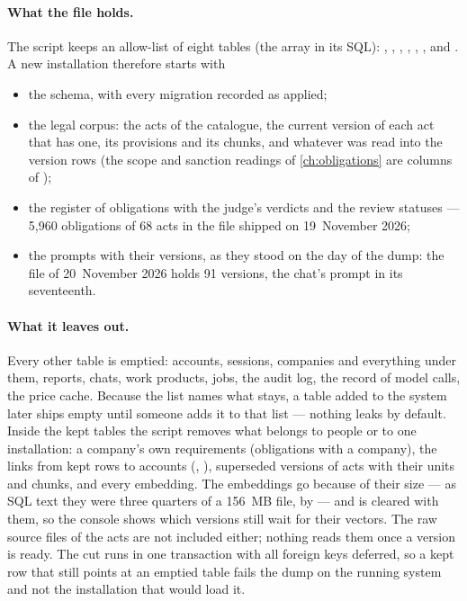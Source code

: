 \paragraph{What the file holds.} The script keeps an allow-list of eight tables (the array
 in its SQL): , ,
, , , ,
 and . A new installation therefore starts with
\begin{itemize}
  \item the schema, with every migration recorded as applied;
  \item the legal corpus: the acts of the catalogue, the current version of each act that has
    one, its provisions and its chunks, and whatever was read into the version rows (the scope
    and sanction readings of \cref{ch:obligations} are columns of
    );
  \item the register of obligations with the judge's verdicts and the review statuses ---
    5,960 obligations of 68 acts in the file shipped on 19~November 2026;
  \item the prompts with their versions, as they stood on the day of the dump: the file of
    20~November 2026 holds 91 versions, the chat's prompt in its seventeenth.
\end{itemize}

\paragraph{What it leaves out.} Every other table is emptied: accounts, sessions, companies
and everything under them, reports, chats, work products, jobs, the audit log, the record of
model calls, the price cache. Because the list names what stays, a table added to the system
later ships empty until someone adds it to that list --- nothing leaks by default. Inside
the kept tables the script removes what belongs to people or to one installation: a company's
own requirements (obligations with a company), the links from kept rows to accounts
(, ), superseded versions of acts with their units and
chunks, and every embedding. The embeddings go because of their size --- as SQL text they
were three quarters of a 156~MB file, by  --- and
 is cleared with them, so the console shows which versions still wait for
their vectors. The raw source files of the acts are not included either; nothing reads them
once a version is ready. The cut runs in one transaction with all foreign keys deferred, so a
kept row that still points at an emptied table fails the dump on the running system and not
the installation that would load it.

